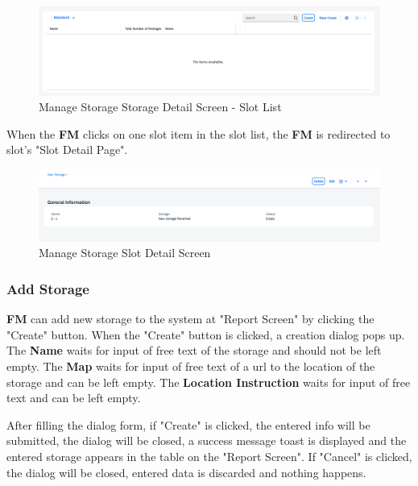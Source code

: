 \begin{figure}[H] %
	\centering
	\includegraphics[width=1\linewidth]{images/user_doc/storage/StorageObjectPage/slotList.png}
	\caption{Manage Storage Storage Detail Screen - Slot List}
	\label{fig:MSstorageObjSlotList}
\end{figure}

\bigskip

When the \textbf{FM} clicks on one slot item in the slot list, the \textbf{FM} is redirected to slot's "Slot Detail Page".

\begin{figure}[H] %
	\centering
	\includegraphics[width=1\linewidth]{images/user_doc/storage/SlotObjectPage/slotObjOverview.png}
	\caption{Manage Storage Slot Detail Screen}
	\label{fig:MSslotObjOverview}
\end{figure}


\subsubsection{Add Storage}

\textbf{FM} can add new storage to the system at "Report Screen" by clicking the "Create" button.
When the "Create" button is clicked, a creation dialog pops up. The \textbf{Name} waits for input of free text of the storage and should not be left empty. The \textbf{Map} waits for input of free text of a url to the location of the storage and can be left empty. The \textbf{Location Instruction} waits for input of free text and can be left empty.

After filling the dialog form, if "Create" is clicked, the entered info will be submitted, the dialog will be closed, a success message toast is displayed and the entered storage appears in the table on the "Report Screen". If "Cancel" is clicked, the dialog will be closed, entered data is discarded and nothing happens.


